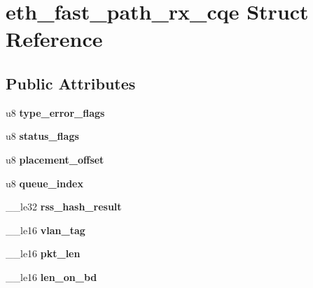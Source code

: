 \hypertarget{structeth__fast__path__rx__cqe}{
\section{eth\_\-fast\_\-path\_\-rx\_\-cqe Struct Reference}
\label{structeth__fast__path__rx__cqe}
}
\subsection*{Public Attributes}
\begin{DoxyCompactItemize}
\item 
\hypertarget{structeth__fast__path__rx__cqe_a3f5b249e526743f5690e4ea00cf96898}{
u8 {\bfseries type\_\-error\_\-flags}}
\label{structeth__fast__path__rx__cqe_a3f5b249e526743f5690e4ea00cf96898}

\item 
\hypertarget{structeth__fast__path__rx__cqe_a83152767668415e6790526cd54612043}{
u8 {\bfseries status\_\-flags}}
\label{structeth__fast__path__rx__cqe_a83152767668415e6790526cd54612043}

\item 
\hypertarget{structeth__fast__path__rx__cqe_a5d8719bfc894fe0012e774a1cfc1baa6}{
u8 {\bfseries placement\_\-offset}}
\label{structeth__fast__path__rx__cqe_a5d8719bfc894fe0012e774a1cfc1baa6}

\item 
\hypertarget{structeth__fast__path__rx__cqe_a251900a4bc53e0e4b4363df5d85d42f8}{
u8 {\bfseries queue\_\-index}}
\label{structeth__fast__path__rx__cqe_a251900a4bc53e0e4b4363df5d85d42f8}

\item 
\hypertarget{structeth__fast__path__rx__cqe_afc7c8f63254e5705b7d067a3f0d5ba57}{
\_\-\_\-le32 {\bfseries rss\_\-hash\_\-result}}
\label{structeth__fast__path__rx__cqe_afc7c8f63254e5705b7d067a3f0d5ba57}

\item 
\hypertarget{structeth__fast__path__rx__cqe_a7019c0980c2523e4d4d33a2a0da7ff6a}{
\_\-\_\-le16 {\bfseries vlan\_\-tag}}
\label{structeth__fast__path__rx__cqe_a7019c0980c2523e4d4d33a2a0da7ff6a}

\item 
\hypertarget{structeth__fast__path__rx__cqe_a4d5bf9355e28c63aba2eaa3c4a194b7e}{
\_\-\_\-le16 {\bfseries pkt\_\-len}}
\label{structeth__fast__path__rx__cqe_a4d5bf9355e28c63aba2eaa3c4a194b7e}

\item 
\hypertarget{structeth__fast__path__rx__cqe_aef9e1333d793efeddb9f33759dfb9c1c}{
\_\-\_\-le16 {\bfseries len\_\-on\_\-bd}}
\label{structeth__fast__path__rx__cqe_aef9e1333d793efeddb9f33759dfb9c1c}


\end{DoxyCompactItemize}
